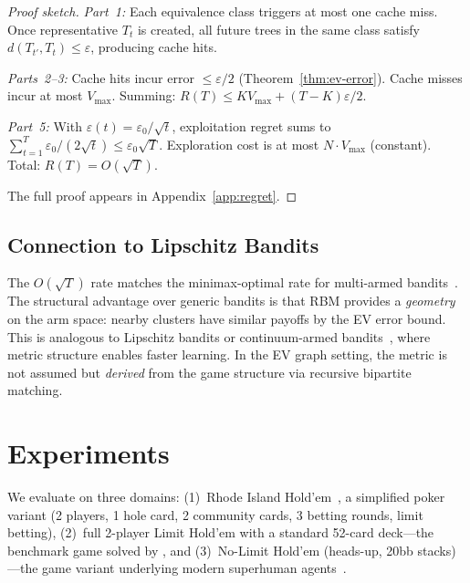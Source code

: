 \documentclass[11pt]{article}
\begin{document}
\begin{proof}[Proof sketch]
\emph{Part~1:} Each equivalence class triggers at most one cache miss.
Once representative $T_t$ is created, all future trees in the same class
satisfy $d(T_{t'}, T_t) \le \varepsilon$, producing cache hits.

\emph{Parts~2--3:} Cache hits incur error $\le \varepsilon/2$
(Theorem~\ref{thm:ev-error}). Cache misses incur at most $V_{\max}$.
Summing: $R(T) \le K V_{\max} + (T-K)\varepsilon/2$.

\emph{Part~5:} With $\varepsilon(t) = \varepsilon_0/\sqrt{t}$,
exploitation regret sums to $\sum_{t=1}^T \varepsilon_0/(2\sqrt{t}) \le
\varepsilon_0 \sqrt{T}$. Exploration cost is at most $N \cdot V_{\max}$
(constant). Total: $R(T) = O(\sqrt{T})$.

The full proof appears in Appendix~\ref{app:regret}.
\end{proof}

\subsection{Connection to Lipschitz Bandits}

The $O(\sqrt{T})$ rate matches the minimax-optimal rate for multi-armed
bandits~\citep{auer2002finite}. The structural advantage over generic
bandits is that RBM provides a \emph{geometry} on the arm space: nearby
clusters have similar payoffs by the EV error bound. This is analogous
to Lipschitz bandits or continuum-armed bandits~\citep{kleinberg2005nearly},
where metric structure enables faster learning. In the EV graph setting,
the metric is not assumed but \emph{derived} from the game structure via
recursive bipartite matching.

\section{Experiments}
\label{sec:experiments}

We evaluate on three domains: (1)~Rhode Island
Hold'em~\citep{gilpin2005rhode}, a simplified poker variant (2 players,
1 hole card, 2 community cards, 3 betting rounds, limit betting),
(2)~full 2-player Limit Hold'em with a standard 52-card deck---the
benchmark game solved by \citet{bowling2015solving}, and (3)~No-Limit
Hold'em (heads-up, 20bb stacks)---the game variant underlying
modern superhuman agents~\citep{brown2018superhuman}.
\end{document}
